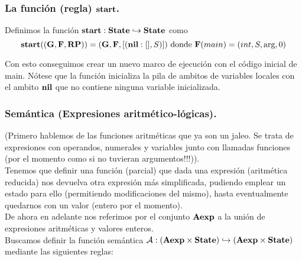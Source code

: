 \subsubsection{La función (regla) $\textbf{start}$.}
Definimos la función $\textbf{start}: \textbf{State} \hookrightarrow \textbf{State}$ como
$$
\textbf{start}((\mathbf{G}, \mathbf{F}, \textbf{RP})) = (\mathbf{G}, \mathbf{F}, [(\textbf{nil}:[], S)]) \text{ donde } \mathbf{F}(main) = (int, S, \text{arg}, 0)
$$

Con esto conseguimos crear un nuevo marco de ejecución con el código inicial de main. Nótese que la función inicializa la pila de ambitos de variables locales con el ambito $\textbf{nil}$ que no contiene ninguna variable inicializada.

\subsubsection{Semántica (Expresiones aritmético-lógicas).}
(Primero hablemos de las funciones aritméticas que ya son un jaleo. Se trata de expresiones con operandos, numerales y variables junto con llamadas funciones (por el momento como si no tuvieran argumentos!!!)).\\

Tenemos que definir una función (parcial) que dada una expresión (aritmética reducida) nos devuelva otra expresión más simplificada, pudiendo emplear un estado para ello (permitiendo modificaciones del mismo), hasta eventualmente quedarnos con un valor (entero por el momento).\\

De ahora en adelante nos referimos por el conjunto $\textbf{Aexp}$ a la unión de expresiones aritméticas y valores enteros.\\

Buscamos definir la función semántica $\mathcal{A}: (\textbf{Aexp} \times \textbf{State}) \hookrightarrow (\textbf{Aexp} \times \textbf{State})$ mediante las siguientes reglas:

\begin{prooftree*}
\end{prooftree*}

\begin{prooftree*}
\end{prooftree*}

\begin{prooftree*}
\end{prooftree*}

